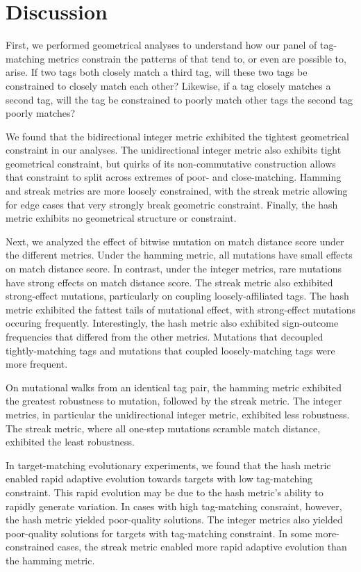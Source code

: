 \section{Discussion}

% 
First, we performed geometrical analyses to understand how our panel of tag-matching metrics constrain the patterns of that tend to, or even are possible to, arise.
If two tags both closely match a third tag, will these two tags be constrained to closely match each other?
Likewise, if a tag closely matches a second tag, will the tag be constrained to poorly match other tags the second tag poorly matches?

We found that the bidirectional integer metric exhibited the tightest geometrical constraint in our analyses.
The unidirectional integer metric also exhibits tight geometrical constraint, but quirks of its non-commutative construction allows that constraint to split across extremes of poor- and close-matching.
Hamming and streak metrics are more loosely constrained, with the streak metric allowing for edge cases that very strongly break geometric constraint.
Finally, the hash metric exhibits no geometrical structure or constraint.

Next, we analyzed the effect of bitwise mutation on match distance score under the different metrics.
Under the hamming metric, all mutations have small effects on match distance score.
In contrast, under the integer metrics, rare mutations have strong effects on match distance score.
The streak metric also exhibited strong-effect mutations, particularly on coupling loosely-affiliated tags.
The hash metric exhibited the fattest tails of mutational effect, with strong-effect mutations occuring frequently.
Interestingly, the hash metric also exhibited sign-outcome frequencies that differed from the other metrics.
Mutations that decoupled tightly-matching tags and mutations that coupled loosely-matching tags were more frequent.

On mutational walks from an identical tag pair, the hamming metric exhibited the greatest robustness to mutation, followed by the streak metric.
The integer metrics, in particular the unidirectional integer metric, exhibited less robustness.
The streak metric, where all one-step mutations scramble match distance, exhibited the least robustness.

In target-matching evolutionary experiments, we found that the hash metric enabled rapid adaptive evolution towards targets with low tag-matching constraint.
This rapid evolution may be due to the hash metric's ability to rapidly generate variation.
In cases with high tag-matching consraint, however, the hash metric yielded poor-quality solutions.
The integer metrics also yielded poor-quality solutions for targets with tag-matching constraint.
In some more-constrained cases, the streak metric enabled more rapid adaptive evolution than the hamming metric.

